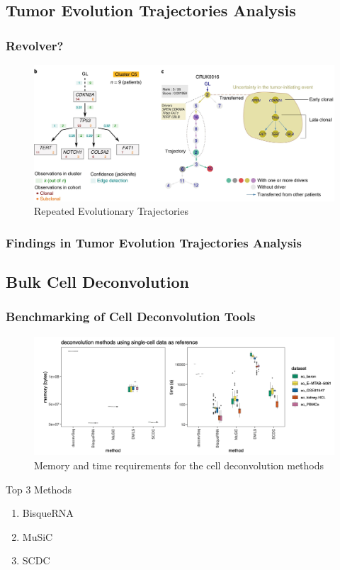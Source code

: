 \documentclass{beamer}
\begin{document}
    \subsection{Tumor Evolution Trajectories Analysis}
    \begin{frame}
        \frametitle{Revolver?}

        \begin{figure}
            \includegraphics[width=0.8 \linewidth]{figures/Workflow/revolver.jpg}
            \caption{Repeated Evolutionary Trajectories \cite{revolver1}}
        \end{figure}
    \end{frame}

    \begin{frame}
        \frametitle{Findings in Tumor Evolution Trajectories Analysis}
    \end{frame}

    \subsection{Bulk Cell Deconvolution}
    \begin{frame}
        \frametitle{Benchmarking of Cell Deconvolution Tools}

        \begin{figure}
            \includegraphics[width=0.6 \linewidth]{figures/Workflow/Deconvolution.png}
            \caption{Memory and time requirements for the cell deconvolution methods \protect\cite{deconvolution1}}
        \end{figure}

        \begin{block}{Top 3 Methods}
            \begin{enumerate}
                \item BisqueRNA \cite{Bisque1}
                \item MuSiC \cite{MuSiC1}
                \item SCDC \cite{SCDC1}
            \end{enumerate}
        \end{block}
    \end{frame}
\end{document}
